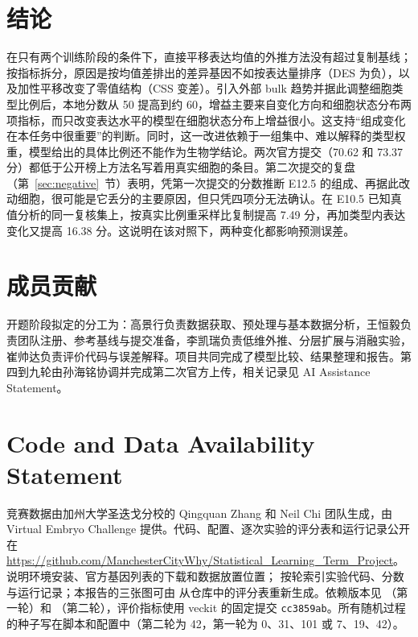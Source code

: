 \documentclass[UTF8,zihao=-4,fontset=none,a4paper]{ctexart}
\begin{document}
\section{结论}

在只有两个训练阶段的条件下，直接平移表达均值的外推方法没有超过复制基线；按指标拆分，原因是按均值差排出的差异基因不如按表达量排序（DES 为负），以及加性平移改变了零值结构（CSS 变差）。引入外部 bulk 趋势并据此调整细胞类型比例后，本地分数从 50 提高到约 60，增益主要来自变化方向和细胞状态分布两项指标，而只改变表达水平的模型在细胞状态分布上增益很小。这支持“组成变化在本任务中很重要”的判断。同时，这一改进依赖于一组集中、难以解释的类型权重，模型给出的具体比例还不能作为生物学结论。两次官方提交（70.62 和 73.37 分）都低于公开榜上方法名写着用真实细胞的条目。第二次提交的复盘（第~\ref{sec:negative}~节）表明，凭第一次提交的分数推断 E12.5 的组成、再据此改动细胞，很可能是它丢分的主要原因，但只凭四项分无法确认。在 E10.5 已知真值分析的同一复核集上，按真实比例重采样比复制提高 7.49 分，再加类型内表达变化又提高 16.38 分。这说明在该对照下，两种变化都影响预测误差。

\section*{成员贡献}

开题阶段拟定的分工为：高景行负责数据获取、预处理与基本数据分析，王恒毅负责团队注册、参考基线与提交准备，李凯瑞负责低维外推、分层扩展与消融实验，崔帅达负责评价代码与误差解释。项目共同完成了模型比较、结果整理和报告。第四到九轮由孙海铭协调并完成第二次官方上传，相关记录见 AI Assistance Statement。

\section*{Code and Data Availability Statement}

竞赛数据由加州大学圣迭戈分校的 Qingquan Zhang 和 Neil Chi 团队生成，由 Virtual Embryo Challenge 提供\cite{data}。代码、配置、逐次实验的评分表和运行记录公开在 \url{https://github.com/ManchesterCityWhy/Statistical_Learning_Term_Project}。 说明环境安装、官方基因列表的下载和数据放置位置； 按轮索引实验代码、分数与运行记录；本报告的三张图可由  从仓库中的评分表重新生成。依赖版本见 （第一轮）和 （第二轮），评价指标使用 veckit 的固定提交 \texttt{cc3859ab}。所有随机过程的种子写在脚本和配置中（第二轮为 42，第一轮为 0、31、101 或 7、19、42）。
\end{document}

